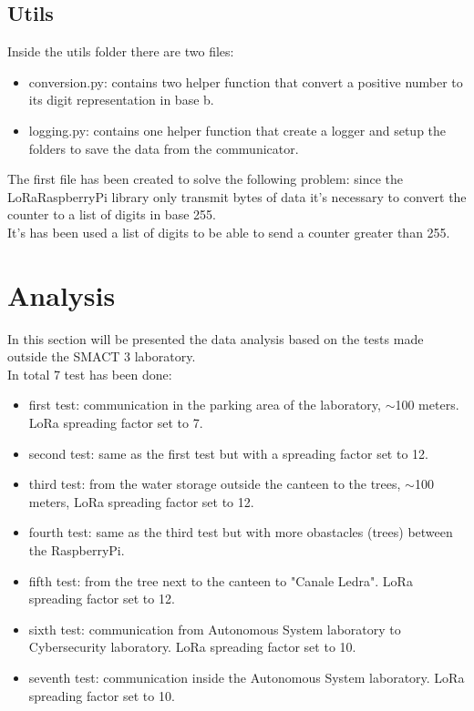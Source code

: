 \documentclass[14pt]{article}
\begin{document}
\subsection{Utils}
Inside the utils folder there are two files:
\begin{itemize}
        \item conversion.py: contains two helper function that convert a positive number to its digit representation in base b.
        \item logging.py: contains one helper function that create a logger and setup the folders to save the data from the communicator.
\end{itemize}
The first file has been created to solve the following problem: since the LoRaRaspberryPi library only transmit bytes of data it's necessary to convert the counter to a list of digits in base 255. \\
It's has been used a list of digits to be able to send a counter greater than 255.
\section{Analysis}
In this section will be presented the data analysis based on the tests made outside the SMACT 3 laboratory. \\
In total 7 test has been done:
\begin{itemize}
        \item  first test: communication in the parking area of the laboratory, $\sim$100 meters. LoRa spreading factor set to 7.
        \item  second test: same as the first test but with a spreading factor set to 12.
        \item  third test: from the water storage outside the canteen to the trees, $\sim$100 meters, LoRa spreading factor set to 12.
        \item  fourth test: same as the third test but with more obastacles (trees) between the RaspberryPi.
        \item  fifth test: from the tree next to the canteen to "Canale Ledra". LoRa spreading factor set to 12.
        \item  sixth test: communication from Autonomous System laboratory to Cybersecurity laboratory. LoRa spreading factor set to 10.
        \item  seventh test: communication inside the Autonomous System laboratory. LoRa spreading factor set to 10.
\end{itemize}
\end{document}
